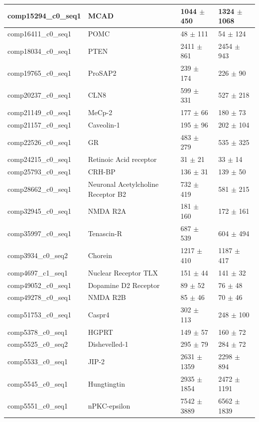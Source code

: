 \documentclass[10.5pt]{article}
\begin{document}
\begin{center}
\begin{longtable}{ | l | l | l | l | }
comp15294\_c0\_seq1	&	MCAD	&	1044	$\pm$	450	&	1324	$\pm$	1068	 \\ \hline
comp16411\_c0\_seq1	&	POMC	&	48	$\pm$	111	&	54	$\pm$	124	 \\ \hline
comp18034\_c0\_seq1	&	PTEN	&	2411	$\pm$	861	&	2454	$\pm$	943	\\ \hline
comp19765\_c0\_seq1	&	ProSAP2	&	239	$\pm$	174	&	226	$\pm$	90	\\ \hline
comp20237\_c0\_seq1	&	CLN8	&	599	$\pm$	331	&	527	$\pm$	218	\\ \hline
comp21149\_c0\_seq1	&	MeCp-2	&	177	$\pm$	66	&	180	$\pm$	73	 \\ \hline
comp21157\_c0\_seq1	&	Caveolin-1	&	195	$\pm$	96	&	202	$\pm$	104	 \\ \hline
comp22526\_c0\_seq1	&	GR	&	483	$\pm$	279	&	535	$\pm$	325	\\ \hline
comp24215\_c0\_seq1	&	Retinoic Acid receptor	&	31	$\pm$	21	&	33	$\pm$	14	 \\ \hline
comp25793\_c0\_seq1	&	CRH-BP	&	136	$\pm$	31	&	139	$\pm$	50	 \\ \hline
comp28662\_c0\_seq1	&	Neuronal Acetylcholine Receptor B2	&	732	$\pm$	419	&	581	$\pm$	215	\\ \hline
comp32945\_c0\_seq1	&	NMDA R2A	&	181	$\pm$	160	&	172	$\pm$	161	 \\ \hline
comp35997\_c0\_seq1	&	Tenascin-R	&	687	$\pm$	539	&	604	$\pm$	494	\\ \hline
comp3934\_c0\_seq2	&	Chorein	&	1217	$\pm$	410	&	1187	$\pm$	417	\\ \hline
comp4697\_c1\_seq1	&	Nuclear Receptor TLX	&	151	$\pm$	44	&	141	$\pm$	32	 \\ \hline
comp49052\_c0\_seq1	&	Dopamine D2 Receptor	&	89	$\pm$	52	&	76	$\pm$	48	 \\ \hline
comp49278\_c0\_seq1	&	NMDA R2B	&	85	$\pm$	46	&	70	$\pm$	46	 \\ \hline
comp51753\_c0\_seq1	&	Caspr4	&	302	$\pm$	113	&	248	$\pm$	100	\\ \hline
comp5378\_c0\_seq1	&	HGPRT	&	149	$\pm$	57	&	160	$\pm$	72	\\ \hline
comp5525\_c0\_seq2	&	Dishevelled-1	&	295	$\pm$	79	&	284	$\pm$	72	 \\ \hline
comp5533\_c0\_seq1	&	JIP-2	&	2631	$\pm$	1359	&	2298	$\pm$	894	 \\ \hline
comp5545\_c0\_seq1	&	Hungtingtin	&	2935	$\pm$	1854	&	2472	$\pm$	1191	 \\ \hline
comp5551\_c0\_seq1	&	nPKC-epsilon	&	7542	$\pm$	3889	&	6562	$\pm$	1839	 \\ \hline

\end{longtable}
\end{center}
\end{document}

